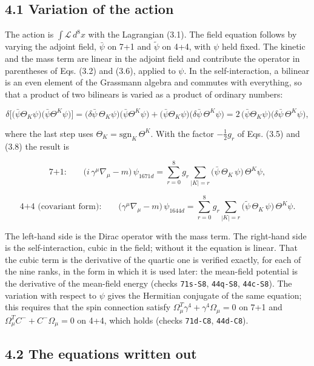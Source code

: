 \documentclass[
  10pt,
]{article}
\begin{document}
\hypertarget{variation-of-the-action}{%
\subsection{4.1 Variation of the action}\label{variation-of-the-action}}

The action is \(\int\mathcal L\,d^8x\) with the Lagrangian (3.1). The
field equation follows by varying the adjoint field, \(\bar\psi\) on 7+1
and \(\tilde\psi\) on 4+4, with \(\psi\) held fixed. The kinetic and the
mass term are linear in the adjoint field and contribute the operator in
parentheses of Eqs. (3.2) and (3.6), applied to \(\psi\). In the
self-interaction, a bilinear is an even element of the Grassmann algebra
and commutes with everything, so that a product of two bilinears is
varied as a product of ordinary numbers:

\[\delta\Big[\big(\bar\psi\Theta_K\psi\big)\big(\bar\psi\Theta^K\psi\big)\Big]
=\big(\delta\bar\psi\,\Theta_K\psi\big)\big(\bar\psi\Theta^K\psi\big)+\big(\bar\psi\Theta_K\psi\big)\big(\delta\bar\psi\,\Theta^K\psi\big)
=2\,\big(\bar\psi\Theta_K\psi\big)\big(\delta\bar\psi\,\Theta^K\psi\big),\]

where the last step uses \(\Theta_K=\mathrm{sgn}_K\,\Theta^K\). With the
factor \(-\tfrac12g_r\) of Eqs. (3.5) and (3.8) the result is

\[\text{7+1:}\qquad\big(i\,\gamma^\mu\nabla_\mu-m\big)\,\psi_{1671d}
=\sum_{r=0}^{8}g_r\sum_{|K|=r}\big(\bar\psi\,\Theta_K\,\psi\big)\,\Theta^K\psi,\tag{4.1}\]

\[\text{4+4 (covariant form):}\qquad\big(\gamma^\mu\nabla_\mu-m\big)\,\psi_{1644d}
=\sum_{r=0}^{8}g_r\sum_{|K|=r}\big(\tilde\psi\,\Theta_K\,\psi\big)\,\Theta^K\psi.\tag{4.2}\]

The left-hand side is the Dirac operator with the mass term. The
right-hand side is the self-interaction, cubic in the field; without it
the equation is linear. That the cubic term is the derivative of the
quartic one is verified exactly, for each of the nine ranks, in the form
in which it is used later: the mean-field potential is the derivative of
the mean-field energy (checks \texttt{71s-S8}, \texttt{44q-S8},
\texttt{44c-S8}). The variation with respect to \(\psi\) gives the
Hermitian conjugate of the same equation; this requires that the spin
connection satisfy \(\Omega_\mu^T\gamma^4+\gamma^4\Omega_\mu=0\) on 7+1
and \(\Omega_\mu^TC^-+C^-\Omega_\mu=0\) on 4+4, which holds (checks
\texttt{71d-C8}, \texttt{44d-C8}).

\hypertarget{the-equations-written-out}{%
\subsection{4.2 The equations written
out}\label{the-equations-written-out}}
\end{document}
